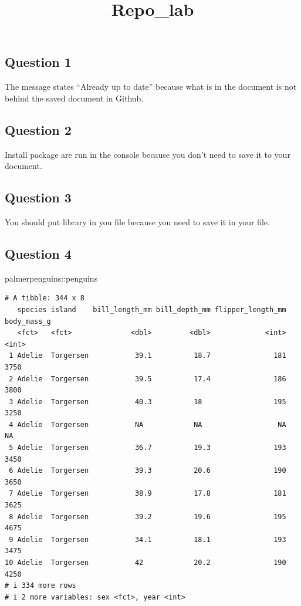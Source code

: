\documentclass[
  letterpaper,
  DIV=11,
  numbers=noendperiod]{scrartcl}
\title{Repo\_lab}
\author{}
\date{}
\newenvironment{Shaded}{\begin{snugshade}}{\end{snugshade}}
\newcommand{\NormalTok}[1]{\textcolor[rgb]{0.00,0.23,0.31}{#1}}
\newcommand{\SpecialCharTok}[1]{\textcolor[rgb]{0.37,0.37,0.37}{#1}}
\begin{document}
\maketitle


\subsection{Question 1}\label{question-1}

The message states ``Already up to date'' because what is in the
document is not behind the saved document in Github.

\subsection{Question 2}\label{question-2}

Install package are run in the console because you don't need to save it
to your document.

\subsection{Question 3}\label{question-3}

You should put library in you file because you need to save it in your
file.

\subsection{Question 4}\label{question-4}

\begin{Shaded}
\begin{Highlighting}[]
\NormalTok{palmerpenguins}\SpecialCharTok{::}\NormalTok{penguins}
\end{Highlighting}
\end{Shaded}

\begin{verbatim}
# A tibble: 344 x 8
   species island    bill_length_mm bill_depth_mm flipper_length_mm body_mass_g
   <fct>   <fct>              <dbl>         <dbl>             <int>       <int>
 1 Adelie  Torgersen           39.1          18.7               181        3750
 2 Adelie  Torgersen           39.5          17.4               186        3800
 3 Adelie  Torgersen           40.3          18                 195        3250
 4 Adelie  Torgersen           NA            NA                  NA          NA
 5 Adelie  Torgersen           36.7          19.3               193        3450
 6 Adelie  Torgersen           39.3          20.6               190        3650
 7 Adelie  Torgersen           38.9          17.8               181        3625
 8 Adelie  Torgersen           39.2          19.6               195        4675
 9 Adelie  Torgersen           34.1          18.1               193        3475
10 Adelie  Torgersen           42            20.2               190        4250
# i 334 more rows
# i 2 more variables: sex <fct>, year <int>
\end{verbatim}
\end{document}
